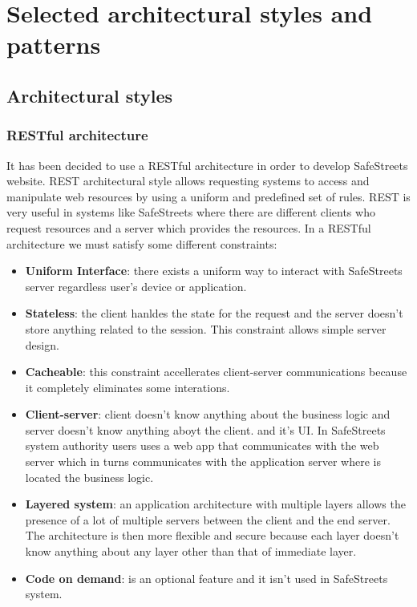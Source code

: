     \newpage
    \section{Selected architectural styles and patterns}  
        \subsection{Architectural styles}
    
            \subsubsection{RESTful architecture}
            It has been decided to use a RESTful architecture in order to
            develop SafeStreets website. REST architectural style allows
            requesting systems to access and manipulate web resources by using a
            uniform and predefined set of rules. REST is very useful in systems
            like SafeStreets where there are different clients who request
            resources and a server which provides the resources. In a RESTful
            architecture we must satisfy some different constraints:
            \begin{itemize}
                \item \textbf{Uniform Interface}: there exists a uniform way to
                interact with SafeStreets server regardless user's device or
                application.
                \item \textbf{Stateless}: the client hanldes the state for the
                request and the server doesn't store anything related to the
                session. This constraint allows simple server design.
                \item \textbf{Cacheable}: this constraint accellerates
                client-server communications because it completely eliminates
                some interations.
                \item \textbf{Client-server}: client doesn't know anything about
                the business logic and server doesn't know anything aboyt the
                client. and it's UI. In SafeStreets system authority users uses
                a web app that communicates with the web server which in turns
                communicates with the application server where is located the
                business logic.
                \item \textbf{Layered system}: an application architecture with
                multiple layers allows the presence of a lot of multiple servers
                between the client and the end server. The architecture is then
                more flexible and secure because each layer doesn't know
                anything about any layer other than that of immediate layer.
                \item \textbf{Code on demand}: is an optional feature and it
                isn't used in SafeStreets system.
            \end{itemize}    

